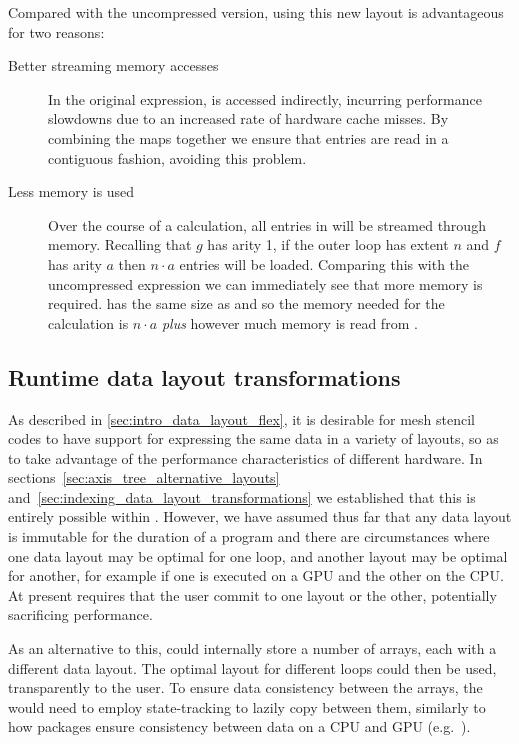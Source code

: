 \documentclass[thesis]{subfiles}
\begin{document}
Compared with the uncompressed version, using this new layout is advantageous for two reasons:
\begin{description}
  \item[Better streaming memory accesses]
    In the original expression,  is accessed indirectly, incurring performance slowdowns due to an increased rate of hardware cache misses.
    By combining the maps together we ensure that entries are read in a contiguous fashion, avoiding this problem.
  \item[Less memory is used]
    Over the course of a calculation, all entries in  will be streamed through memory.
    Recalling that $g$ has arity 1, if the outer loop has extent $n$ and $f$ has arity $a$ then $n\cdot a$ entries will be loaded.
    Comparing this with the uncompressed expression we can immediately see that more memory is required.
     has the same size as  and so the memory needed for the calculation is $n\cdot a$ \emph{plus} however much memory is read from .
\end{description}

\subsection{Runtime data layout transformations}

As described in \cref{sec:intro_data_layout_flex}, it is desirable for mesh stencil codes to have support for expressing the same data in a variety of layouts, so as to take advantage of the performance characteristics of different hardware.
In sections~\ref{sec:axis_tree_alternative_layouts} and~\ref{sec:indexing_data_layout_transformations} we established that this is entirely possible within .
However, we have assumed thus far that any data layout is immutable for the duration of a program and there are circumstances where one data layout may be optimal for one loop, and another layout may be optimal for another, for example if one is executed on a GPU and the other on the CPU.
At present  requires that the user commit to one layout or the other, potentially sacrificing performance.

As an alternative to this,   could internally store a number of arrays, each with a different data layout.
The optimal layout for different loops could then be used, transparently to the user.
To ensure data consistency between the arrays, the  would need to employ state-tracking to lazily copy between them, similarly to how packages ensure consistency between data on a CPU and GPU (e.g.~\cite{millsPerformancePortablePETScGPUbased2020}).
\end{document}
